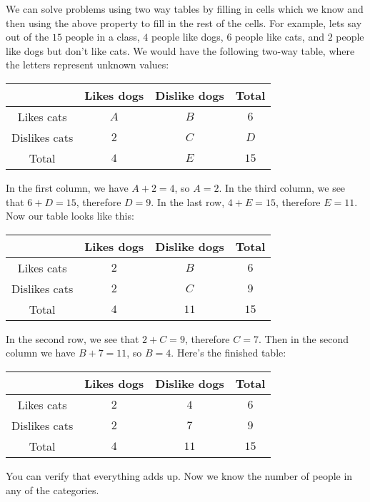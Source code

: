 \documentclass[twocolumn]{article}
\begin{document}
We can solve problems using two way tables by filling in cells which we know and 
then using the above property to fill in the rest of the cells. For example, 
lets say out of the $15$ people in a class, $4$ people like dogs, $6$ people 
like cats, and $2$ people like dogs but don't like cats. We would have the 
following two-way table, where the letters represent unknown values:
\begin{center}
	\begin{tabular}{| c | c | c | c |}
		\hline
                      & Likes dogs & Dislike dogs & Total \\
		\hline
		 Likes cats   & $A$        & $B$          & $6$   \\
		 \hline
		Dislikes cats & $2$        & $C$          & $D$   \\
		\hline
		Total         & $4$        & $E$          & $15$  \\
		\hline
	\end{tabular}
\end{center}
In the first column, we have $A + 2 = 4$, so $A = 2$. In the third column, we 
see that $6 + D = 15$, therefore $D = 9$. In the last row, $4 + E = 15$, 
therefore $E = 11$. Now our table looks like this:
\begin{center}
	\begin{tabular}{| c | c | c | c |}
		\hline
                      & Likes dogs & Dislike dogs & Total \\
		\hline
		 Likes cats   & $2$        & $B$          & $6$   \\
		 \hline
		Dislikes cats & $2$        & $C$          & $9$   \\
		\hline
		Total         & $4$        & $11$         & $15$  \\
		\hline
	\end{tabular}
\end{center}
In the second row, we see that $2 + C = 9$, therefore $C = 7$. Then in the 
second column we have $B + 7 = 11$, so $B = 4$. Here's the finished table:
\begin{center}
	\begin{tabular}{| c | c | c | c |}
		\hline
                      & Likes dogs & Dislike dogs & Total \\
		\hline
		 Likes cats   & $2$        & $4$          & $6$   \\
		 \hline
		Dislikes cats & $2$        & $7$          & $9$   \\
		\hline
		Total         & $4$        & $11$         & $15$  \\
		\hline
	\end{tabular}
\end{center}
You can verify that everything adds up. Now we know the number of people in any 
of the categories.
\end{document}
